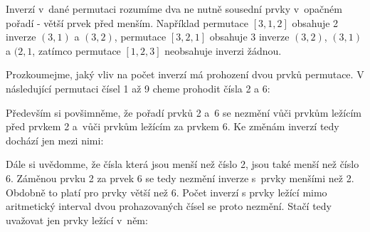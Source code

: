 Inverzí v~dané permutaci rozumíme dva ne nutně sousední prvky v~opačném pořadí - větší prvek před menším. Například permutace \([3, 1, 2]\) obsahuje 2 inverze \((3, 1)\) a \((3, 2)\), permutace \([3, 2, 1]\) obsahuje 3 inverze \((3, 2)\), \((3, 1)\) a \((2, 1\), zatímco permutace \([1, 2, 3]\) neobsahuje inverzi žádnou.

Prozkoumejme, jaký vliv na počet inverzí má prohození dvou prvků permutace. V následující permutaci čísel 1 až 9 cheme prohodit čísla 2 a 6:


Především si povšimněme, že pořadí prvků 2 a~6 se nezmění vůči prvkům ležícím před prvkem 2 a~vůči prvkům ležícím za prvkem 6. Ke změnám inverzí tedy dochází jen mezi nimi:


Dále si uvědomme, že čísla která jsou menší než číslo 2, jsou také menší než číslo 6. Záměnou prvku 2 za prvek 6 se tedy nezmění inverze s~prvky menšími než 2. Obdobně to platí pro prvky větší než 6. Počet inverzí s prvky ležící mimo aritmetický interval dvou prohazovaných čísel se proto nezmění. Stačí tedy uvažovat jen prvky ležící v~něm:



